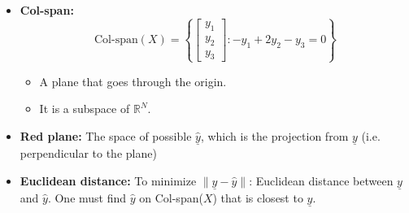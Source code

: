     \begin{example}
        \begin{itemize}
            \item \textbf{Col-span:} \[
            \text{Col-span}(X) = \left\{ 
            \begin{bmatrix}
            y_1 \\
            y_2 \\
            y_3
            \end{bmatrix}
            : -y_1 + 2 y_2 - y_3 = 0 
            \right\}
            \]
            \begin{itemize}
                \item A plane that goes through the origin. 
                \item It is a subspace of \( \mathbb{R}^N \).
            \end{itemize}
            \item \textbf{Red plane:} The space of possible $\underline{\hat{y}}$, which is the projection from $\underline{y}$ (i.e. perpendicular to the plane)
            \item \textbf{Euclidean distance:} To minimize \( \| \underline{y} - \hat{y} \| \): Euclidean distance between \( \underline{y} \) and \( \hat{y} \). One must find \( \hat{y} \) on Col-span(\(X\)) that is closest to \( \underline{y} \). 
        \end{itemize}
    \end{example}
    
